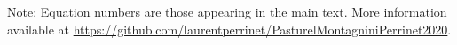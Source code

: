 \documentclass[10pt,letterpaper]{article}
\newcommand{\ms}{\si{\milli\second}}%
\newcommand{\seeFig}[1]{Figure~\ref{fig:#1}}
\newcommand{\seeApp}[1]{Appendix~\ref{app:#1}}
\begin{document}
%
%
%
%
%

Note: Equation numbers are those appearing in the main text. More information available at \url{https://github.com/laurentperrinet/PasturelMontagniniPerrinet2020}.
\end{document}
